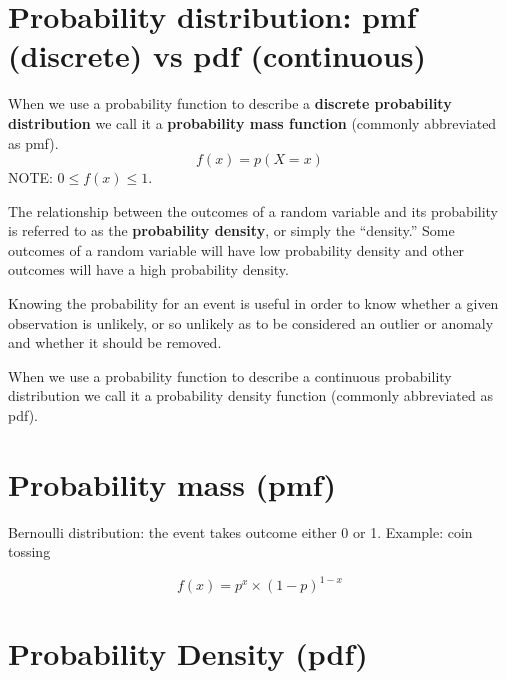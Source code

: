 \section{Probability distribution: pmf (discrete) vs pdf (continuous)}

When we use a probability function to describe a {\bf discrete probability
distribution} we call it a {\bf probability mass function} (commonly abbreviated as
pmf).
\begin{equation}
f(x) = p(X=x)
\end{equation}
NOTE: $0 \le f(x) \le 1$.

\begin{mdframed}
The relationship between the outcomes of a random variable and its probability
is referred to as the {\bf probability density}, or simply the “density.”
Some outcomes of a random variable will have low probability density and other
outcomes will have a high probability density.

Knowing the probability for an event is useful in order to know whether a given
observation is unlikely, or so unlikely as to be considered an outlier or
anomaly and whether it should be removed.

\end{mdframed}

When we use a probability function to describe a continuous probability
distribution we call it a probability density function (commonly abbreviated as
pdf).

\section{Probability mass (pmf)}

Bernoulli distribution: the event takes outcome either 0 or 1. Example: coin
tossing

\begin{equation}
f(x) = p^x \times (1-p)^{1-x}
\end{equation}

\section{Probability Density (pdf)}

